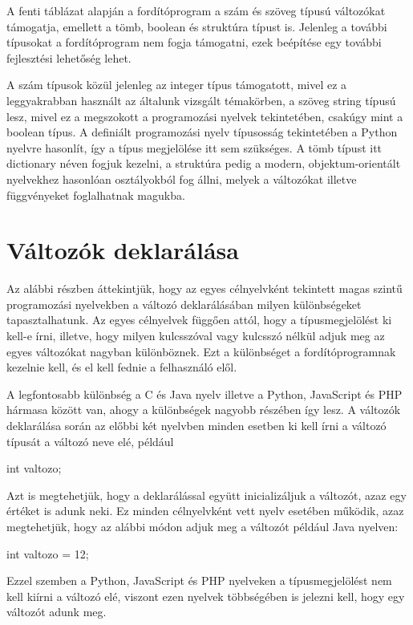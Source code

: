 A fenti táblázat alapján a fordítóprogram a szám és szöveg típusú változókat támogatja, emellett a tömb, boolean és struktúra típust is. Jelenleg a további típusokat a fordítóprogram nem fogja támogatni, ezek beépítése egy további fejlesztési lehetőség lehet.

A szám típusok közül jelenleg az integer típus támogatott, mivel ez a leggyakrabban használt az általunk vizsgált témakörben, a szöveg string típusú lesz, mivel ez a megszokott a programozási nyelvek tekintetében, csakúgy mint a boolean típus. A definiált programozási nyelv típusosság tekintetében a Python nyelvre hasonlít, így a típus megjelölése itt sem szükséges.
A tömb típust itt dictionary néven fogjuk kezelni, a struktúra pedig a modern, objektum-orientált nyelvekhez hasonlóan osztályokból fog állni, melyek a változókat illetve függvényeket foglalhatnak magukba.

\section{Változók deklarálása}

Az alábbi részben áttekintjük, hogy az egyes célnyelvként tekintett magas szintű programozási nyelvekben a változó deklarálásában milyen különbségeket tapasztalhatunk. Az egyes célnyelvek függően attól, hogy a típusmegjelölést ki kell-e írni, illetve, hogy milyen kulcsszóval vagy kulcsszó nélkül adjuk meg az egyes változókat nagyban különböznek. Ezt a különbséget a fordítóprogramnak kezelnie kell, és el kell fednie a felhasználó elől.

A legfontosabb különbség a C és Java nyelv illetve a Python, JavaScript és PHP hármasa között van, ahogy a különbségek nagyobb részében így lesz. A változók deklarálása során az előbbi két nyelvben minden esetben ki kell írni a változó típusát a változó neve elé, például
\begin{cpp}
	int valtozo;
\end{cpp}

Azt is megtehetjük, hogy a deklarálással együtt inicializáljuk a változót, azaz egy értéket is adunk neki. Ez minden célnyelvként vett nyelv esetében működik, azaz megtehetjük, hogy az alábbi módon adjuk meg a változót például Java nyelven:

\begin{cpp}
	int valtozo = 12;
\end{cpp}

Ezzel szemben a Python, JavaScript és PHP nyelveken a típusmegjelölést nem kell kiírni a változó elé, viszont ezen nyelvek többségében is jelezni kell, hogy egy változót adunk meg.


